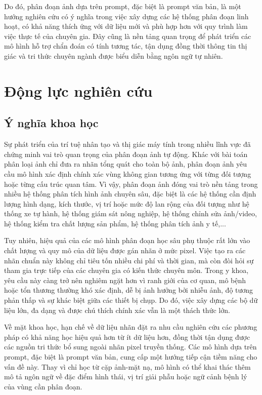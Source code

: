    Do đó, phân đoạn ảnh dựa trên prompt, đặc biệt là prompt văn bản, là một hướng nghiên cứu có ý nghĩa trong việc xây dựng các hệ thống phân đoạn linh hoạt, có khả năng thích ứng với dữ liệu mới và phù hợp hơn với quy trình làm việc thực tế của chuyên gia. Đây cũng là nền tảng quan trọng để phát triển các mô hình hỗ trợ chẩn đoán có tính tương tác, tận dụng đồng thời thông tin thị giác và tri thức chuyên ngành được biểu diễn bằng ngôn ngữ tự nhiên.
\section{Động lực nghiên cứu}
\subsection{Ý nghĩa khoa học}
    Sự phát triển của trí tuệ nhân tạo và thị giác máy tính trong nhiều lĩnh vực đã chứng minh vai trò quan trọng của phân đoạn ảnh tự động. Khác với bài toán phân loại ảnh chỉ đưa ra nhãn tổng quát cho toàn bộ ảnh, phân đoạn ảnh yêu cầu mô hình xác định chính xác vùng không gian tương ứng với từng đối tượng hoặc từng cấu trúc quan tâm. Vì vậy, phân đoạn ảnh đóng vai trò nền tảng trong nhiều hệ thống phân tích hình ảnh chuyên sâu, đặc biệt là các hệ thống cần định lượng hình dạng, kích thước, vị trí hoặc mức độ lan rộng của đối tượng như hệ thống xe tự hành, hệ thống giám sát nông nghiệp, hệ thống chỉnh sửa ảnh/video, hệ thống kiểm tra chất lượng sản phẩm, hệ thống phân tích ảnh y tế,...

    Tuy nhiên, hiệu quả của các mô hình phân đoạn học sâu phụ thuộc rất lớn vào chất lượng và quy mô của dữ liệu được gán nhãn ở mức pixel. Việc tạo ra các nhãn chuẩn này không chỉ tiêu tốn nhiều chi phí và thời gian, mà còn đòi hỏi sự tham gia trực tiếp của các chuyên gia có kiến thức chuyên môn. Trong y khoa, yêu cầu này càng trở nên nghiêm ngặt hơn vì ranh giới của cơ quan, mô bệnh hoặc tổn thương thường khó xác định, dễ bị ảnh hưởng bởi nhiễu ảnh, độ tương phản thấp và sự khác biệt giữa các thiết bị chụp. Do đó, việc xây dựng các bộ dữ liệu lớn, đa dạng và được chú thích chính xác vẫn là một thách thức lớn.

    Về mặt khoa học, hạn chế về dữ liệu nhãn đặt ra nhu cầu nghiên cứu các phương pháp có khả năng học hiệu quả hơn từ ít dữ liệu hơn, đồng thời tận dụng được các nguồn tri thức bổ sung ngoài nhãn pixel truyền thống. Các mô hình dựa trên prompt, đặc biệt là prompt văn bản, cung cấp một hướng tiếp cận tiềm năng cho vấn đề này. Thay vì chỉ học từ cặp ảnh-mặt nạ, mô hình có thể khai thác thêm mô tả ngôn ngữ về đặc điểm hình thái, vị trí giải phẫu hoặc ngữ cảnh bệnh lý của vùng cần phân đoạn.

